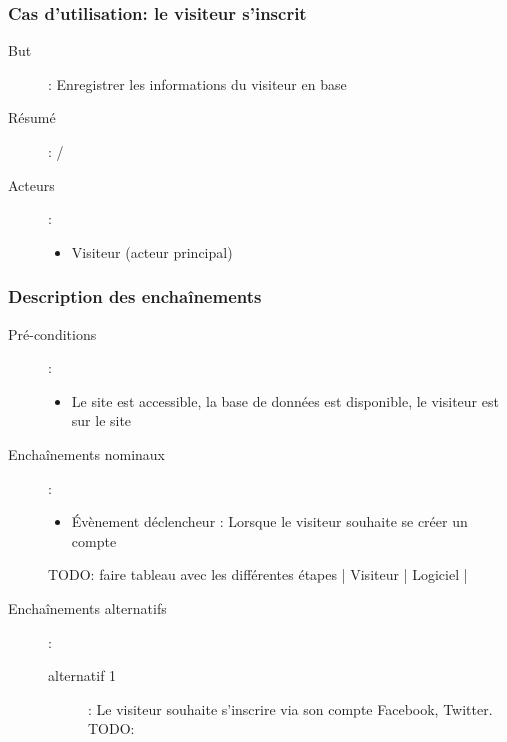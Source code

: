 \documentclass[a4paper,12pt]{report}
\begin{document}
\begin{onehalfspace}
\subsubsection{Cas d'utilisation: le visiteur s'inscrit} %
\begin{description}
  \item[But]: Enregistrer les informations du visiteur en base
  \item[Résumé]: /
  \item[Acteurs]:
    \begin{itemize}
      \item Visiteur (acteur principal)
    \end{itemize}
\end{description}

\subsubsection{Description des enchaînements} %
\label{sub:description_des_encha_nements}

\begin{description}
  \item[Pré-conditions]:
    \begin{itemize}
      \item Le site est accessible, la base de données est disponible, le visiteur est sur le site
    \end{itemize}

  \item[Enchaînements nominaux]:
    \begin{itemize}
      \item Évènement déclencheur : Lorsque le visiteur souhaite se créer un compte
    \end{itemize}

    TODO: faire tableau avec les différentes étapes | Visiteur | Logiciel |

  \item[Enchaînements alternatifs]:
    \begin{description}
      \item[alternatif 1]: Le visiteur souhaite s’inscrire via son compte Facebook, Twitter. TODO:
    \end{description}


\end{description}
\end{onehalfspace}
\end{document}
